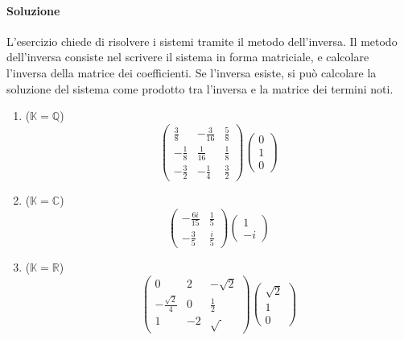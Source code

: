 \documentclass{article}
\theoremstyle{plain}
\theoremstyle{definition}
\theoremstyle{remark}
\begin{document}
\paragraph{Soluzione}
L'esercizio chiede di risolvere i sistemi tramite il metodo dell'inversa. 
Il metodo dell'inversa consiste nel scrivere il sistema in forma matriciale, e calcolare l'inversa della matrice dei coefficienti. Se l'inversa esiste, si può calcolare la soluzione del sistema come prodotto tra l'inversa e la matrice dei termini noti.
\begin{enumerate}
    \item ($\mathbb{K}=\mathbb{Q}$)
    \[\begin{pmatrix}
        \frac{3}{8}&-\frac{3}{16}&\frac{5}{8}\\
        -\frac{1}{8}&\frac{1}{16}&\frac{1}{8}\\
        -\frac{3}{2}&-\frac{1}{4}&\frac{3}{2}
    \end{pmatrix}
    \begin{pmatrix}
        0\\
        1\\
        0
    \end{pmatrix}\]

    \item ($\mathbb{K}=\mathbb{C}$)
    \[\begin{pmatrix}
        -\frac{6i}{15}&\frac{1}{5}\\
        -\frac{3}{5}&\frac{i}{5}
    \end{pmatrix}
    \begin{pmatrix}
        1\\
        -i
    \end{pmatrix}\]

    \item ($\mathbb{K}=\mathbb{R}$)
    \[\begin{pmatrix}
        0&2&-\sqrt{2}\\
        -\frac{\sqrt{2}}{4}&0&\frac{1}{2}\\
        1&-2&\sqrt{\frac{}{}}
    \end{pmatrix}
    \begin{pmatrix}
        \sqrt{2}\\
        1\\
        0
    \end{pmatrix}\]

\end{enumerate}


\vspace{10pt}
\end{document}
